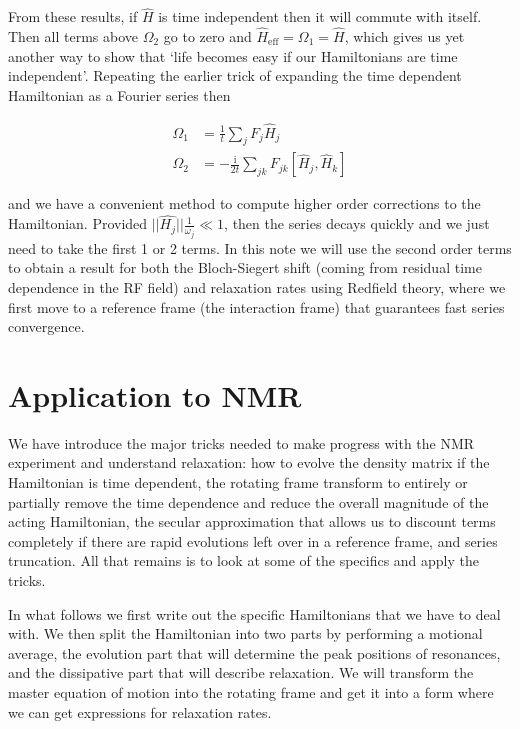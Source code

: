 \documentclass[notitlepage,11pt]{article}
\newcommand{\rmi}{\mathrm{i}}
\begin{document}
From these results, if $\hat{H}$ is time independent then it will commute with itself. Then all terms above $\Omega_2$ go to zero and $\hat{H}_\mathrm{eff}=\Omega_1=\hat{H}$, which gives us yet another way to show that `life becomes easy if our Hamiltonians are time independent'. Repeating the earlier trick of expanding the time dependent Hamiltonian as a Fourier series then

 \begin{equation}
  \begin{array}{rl}
    \Omega_1&= \frac{1}{t}\sum_j F_{j} \hat{H}_{j}  \\
    \Omega_2&= -\frac{\rmi }{2 t}\sum_{jk} F_{jk} [\hat{H}_{j},\hat{H}_{k}] 
\end{array}
  \end{equation}

 and we have a convenient method to compute higher order corrections to the Hamiltonian. Provided $||\hat{H_j}||\frac{1}{\omega_j} \ll 1$, then the series decays quickly and we just need to take the first 1 or 2 terms. In this note we will use the second order terms to obtain a result for both the Bloch-Siegert shift (coming from residual time dependence in the RF field) and relaxation rates using Redfield theory, where we first move to a reference frame (the interaction frame) that guarantees fast series convergence.

\section{Application to NMR}

We have introduce the major tricks needed to make progress with the NMR experiment and understand relaxation: how to evolve the density matrix if the Hamiltonian is time dependent, the rotating frame transform to entirely or partially remove the time dependence and reduce the overall magnitude of the acting Hamiltonian, the secular approximation that allows us to discount terms completely if there are rapid evolutions left over in a reference frame, and series truncation. All that remains is to look at some of the specifics and apply the tricks.

In what follows we first write out the specific Hamiltonians that we have to deal with. We then split the Hamiltonian into two parts by performing a motional average, the evolution part that will determine the peak positions of resonances, and the dissipative part that will describe relaxation. We will transform the master equation of motion into the rotating frame and get it into a form where we can get expressions for relaxation rates.
\end{document}
